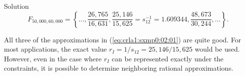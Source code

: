 \begin{vworkexampleparsection}{Solution}
\begin{equation}
\label{eq:crla1:sxmp0:02:01}
F_{50,\!000,60,\!000} = \left\{ \ldots, \frac{26,\!765}{16,\!631},
\frac{25,\!146}{15,\!625} = s_{12}^{-1} = 1.609344,
\frac{48,\!673}{30,\!244}, \ldots \right\}.
\end{equation}

All three of the approximations in (\ref{eq:crla1:sxmp0:02:01}) are quite
good.  For most applications, the exact value $r_I = 1/s_{12} =
25,\!146/15,\!625$ would be used.  However, even in the case where $r_I$
can be represented exactly under the constraints, it is possible to
determine neighboring rational approximations.
\end{vworkexampleparsection}

